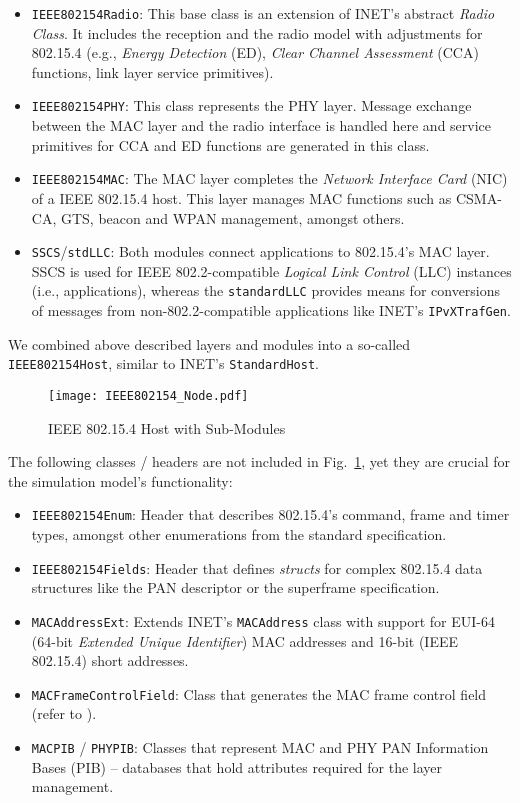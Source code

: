 \documentclass[conference,10pt]{IEEEtran}
\begin{document}
\begin{itemize}
\item	\texttt{IEEE802154Radio}: This base class is an extension of INET's abstract \emph{Radio Class}. It includes the reception and the radio model with adjustments for 802.15.4 (e.g., \emph{Energy Detection} (ED), \emph{Clear Channel Assessment} (CCA) functions, link layer service primitives).
\item	\texttt{IEEE802154PHY}: This class represents the PHY layer. Message exchange between the MAC layer and the radio interface is handled here and service primitives for CCA and ED functions are generated in this class.
\item	\texttt{IEEE802154MAC}: The MAC layer completes the \emph{Network Interface Card} (NIC) of a IEEE 802.15.4 host. This layer manages MAC functions such as CSMA-CA, GTS, beacon and WPAN management, amongst others.
\item	\texttt{SSCS}/\texttt{stdLLC}: Both modules connect applications to 802.15.4's MAC layer. SSCS is used for IEEE 802.2-compatible \emph{Logical Link Control} (LLC) instances (i.e., applications), whereas the \texttt{standardLLC} provides means for conversions of messages from non-802.2-compatible applications like INET's \texttt{IPvXTrafGen}.
\end{itemize}


We combined above described layers and modules into a so-called \texttt{IEEE802154Host}, similar to INET's \texttt{StandardHost}.

\begin{figure}[htb]
	\centering
	\texttt{[image: IEEE802154\_Node.pdf]}
	\caption{IEEE 802.15.4 Host with Sub-Modules}
	\label{fig:IEEE802154_Host}
\end{figure}

The following classes / headers are not included in Fig.~\ref{fig:IEEE802154_Host}, yet they are crucial for the simulation model's functionality:
\begin{itemize}
\item	\texttt{IEEE802154Enum}: Header that describes 802.15.4's command, frame and timer types, amongst other enumerations from the standard specification.
\item	\texttt{IEEE802154Fields}: Header that defines \emph{structs} for complex 802.15.4 data structures like the PAN descriptor or the superframe specification.
\item	\texttt{MACAddressExt}: Extends INET's \texttt{MACAddress} class with support for EUI-64 (64-bit \emph{Extended Unique Identifier}) MAC addresses and 16-bit (IEEE 802.15.4) short addresses.
\item	\texttt{MACFrameControlField}: Class that generates the MAC frame control field (refer to \cite[Sec. 7.2.1.1]{IEEE802154}).
\item	\texttt{MACPIB} / \texttt{PHYPIB}: Classes that represent MAC and PHY PAN Information Bases (PIB) -- databases that hold attributes required for the layer management.
\end{itemize}
\end{document}
